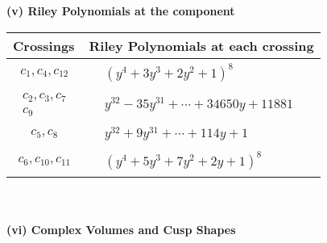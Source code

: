 \documentclass[1p]{elsarticle_modified}
\theoremstyle{definition}
\begin{document}
\newpage\renewcommand{\arraystretch}{1}
\flushleft \textbf{(v) Riley Polynomials at the component}\newline \\
\begin{tabular}{m{50pt}|m{274pt}}
Crossings & \hspace{64pt}Riley Polynomials at each crossing \\
\hline $$\begin{aligned}c_{1},c_{4},c_{12}\end{aligned}$$&$\begin{aligned}
&(y^4+3 y^3+2 y^2+1)^8
\end{aligned}$\\
\hline $$\begin{aligned}c_{2},c_{3},c_{7}\\c_{9}\end{aligned}$$&$\begin{aligned}
&y^{32}-35 y^{31}+\cdots+34650 y+11881
\end{aligned}$\\
\hline $$\begin{aligned}c_{5},c_{8}\end{aligned}$$&$\begin{aligned}
&y^{32}+9 y^{31}+\cdots+114 y+1
\end{aligned}$\\
\hline $$\begin{aligned}c_{6},c_{10},c_{11}\end{aligned}$$&$\begin{aligned}
&(y^4+5 y^3+7 y^2+2 y+1)^8
\end{aligned}$\\
\hline
\end{tabular}\\~\\
\newpage\flushleft \textbf{(vi) Complex Volumes and Cusp Shapes}
\end{document}
